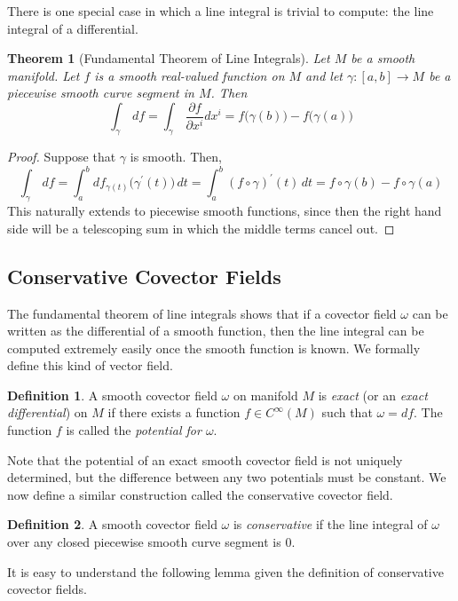 \documentclass{article}
\newtheorem{theorem}{Theorem}[section]
\theoremstyle{remark}
\theoremstyle{definition}
\newtheorem{definition}{Definition}[section]
\begin{document}
There is one special case in which a line integral is trivial to compute: the line integral of a differential. 

\begin{theorem}[Fundamental Theorem of Line Integrals]
Let $M$ be a smooth manifold. Let $f$ is a smooth real-valued function on $M$ and let $\gamma: [a,b] \longrightarrow M$ be a piecewise smooth curve segment in $M$. Then 
\[\int_\gamma \,df = \int_\gamma \, \frac{\partial f}{\partial x^i} dx^i = f\big(\gamma(b)\big) - f\big(\gamma(a)\big)\]
\end{theorem}
\begin{proof}
Suppose that $\gamma$ is smooth. Then, 
\[\int_\gamma\,df = \int_a^b df_{\gamma(t)} \big( \gamma^\prime (t) \big) \,dt = \int_a^b (f \circ \gamma)^\prime (t) \,dt = f \circ \gamma (b) - f \circ \gamma (a)\]
This naturally extends to piecewise smooth functions, since then the right hand side will be a telescoping sum in which the middle terms cancel out. 
\end{proof}

\subsection{Conservative Covector Fields}
The fundamental theorem of line integrals shows that if a covector field $\omega$ can be written as the differential of a smooth function, then the line integral can be computed extremely easily once the smooth function is known. We formally define this kind of vector field. 

\begin{definition}
A smooth covector field $\omega$ on manifold $M$ is \textit{exact} (or an \textit{exact differential}) on $M$ if there exists a function $f \in C^\infty (M)$ such that $\omega = df$. The function $f$ is called the \textit{potential for $\omega$}. 
\end{definition}

Note that the potential of an exact smooth covector field is not uniquely determined, but the difference between any two potentials must be constant. We now define a similar construction called the conservative covector field. 

\begin{definition}
A smooth covector field $\omega$ is \textit{conservative} if the line integral of $\omega$ over any closed piecewise smooth curve segment is $0$. 
\end{definition}

It is easy to understand the following lemma given the definition of conservative covector fields. 
\end{document}
